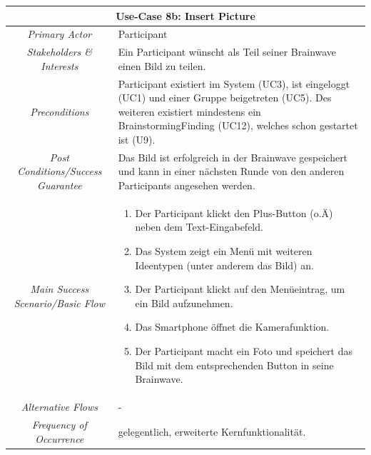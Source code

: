 \renewcommand{\arraystretch}{1.35}
\begin{center}
	\begin{longtable}{| c | p{7cm} |}
		\hline
		\multicolumn{2}{|c|}{\textbf{Use-Case 8b: Insert Picture}}\\
		\hline\hline
		\textit{Primary Actor} & Participant\\
		\hline
		\textit{Stakeholders \& Interests} & Ein Participant wünscht als Teil seiner Brainwave einen Bild zu teilen. \\
		\hline
		\textit{Preconditions} & Participant existiert im System (UC3), ist eingeloggt (UC1) und einer Gruppe beigetreten (UC5). Des weiteren existiert mindestens ein BrainstormingFinding (UC12), welches schon gestartet ist (U9).\\
		\hline
		\textit{Post Conditions/Success Guarantee} & Das Bild ist erfolgreich in der Brainwave gespeichert und kann in einer nächsten Runde von den anderen Participants angesehen werden.\\
		\hline
		\textit{Main Success Scenario/Basic Flow} & 
		\begin{enumerate}[noitemsep]
			\item Der Participant klickt den Plus-Button (o.Ä) neben dem Text-Eingabefeld.
			\item Das System zeigt ein Menü mit weiteren Ideentypen (unter anderem das Bild) an.
			\item Der Participant klickt auf den Menüeintrag, um ein Bild aufzunehmen.
			\item Das Smartphone öffnet die Kamerafunktion.
			\item Der Participant macht ein Foto und speichert das Bild mit dem entsprechenden Button in seine Brainwave.
		\end{enumerate}\\
		\hline
		\textit{Alternative Flows} &
		-\\
		\hline
		\textit{Frequency of Occurrence} & gelegentlich, erweiterte Kernfunktionalität.\\
		\hline
	\end{longtable}
\end{center}

